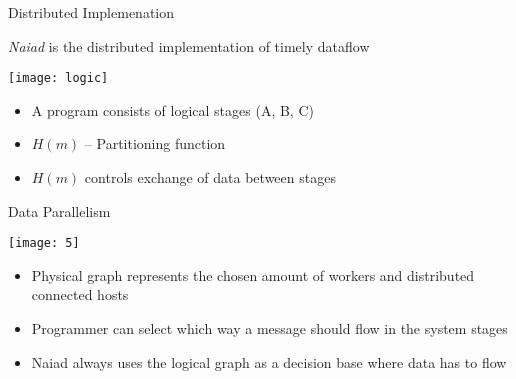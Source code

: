 \begin{frame}[t]{Distributed Implemenation}
  \vspace{0.25cm}
  \begin{center}
    \emph{Naiad} is the distributed implementation of timely dataflow
  \end{center}

  \vspace{0.25cm}
  \begin{center}
    \texttt{[image: logic]}
  \end{center}
  \begin{itemize}\setlength\itemsep{0.25cm}
    \item A program consists of logical stages (A, B, C)
    \item $H(m)$ -- Partitioning function
    \item $H(m)$ controls exchange of data between stages
  \end{itemize}
\end{frame}

\begin{frame}[t]{Data Parallelism}
  \vspace{-0.5cm}
   \begin{center}
    \texttt{[image: 5]}
   \end{center}
   \begin{itemize}\setlength\itemsep{0.25cm}
     \item Physical graph represents the chosen amount of workers and distributed connected hosts
     \item Programmer can select which way a message should flow in the system
stages
\item Naiad always uses the logical graph as a decision base where data has to flow
    \end{itemize}

\end{frame}

